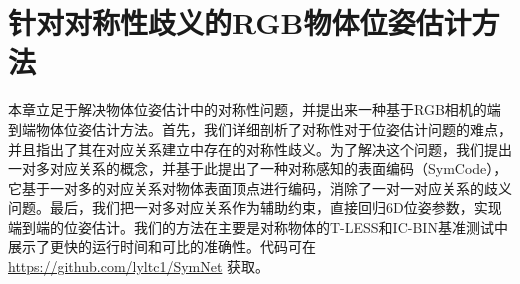 \chapter{针对对称性歧义的RGB物体位姿估计方法}

本章立足于解决物体位姿估计中的对称性问题，并提出来一种基于RGB相机的端到端物体位姿估计方法。首先，我们详细剖析了对称性对于位姿估计问题的难点，并且指出了其在对应关系建立中存在的对称性歧义。为了解决这个问题，我们提出一对多对应关系的概念，并基于此提出了一种对称感知的表面编码（SymCode），它基于一对多的对应关系对物体表面顶点进行编码，消除了一对一对应关系的歧义问题。最后，我们把一对多对应关系作为辅助约束，直接回归6D位姿参数，实现端到端的位姿估计。我们的方法在主要是对称物体的T-LESS和IC-BIN基准测试中展示了更快的运行时间和可比的准确性。代码可在 \href{https://github.com/lyltc1/SymNet}{https://github.com/lyltc1/SymNet} 获取。

